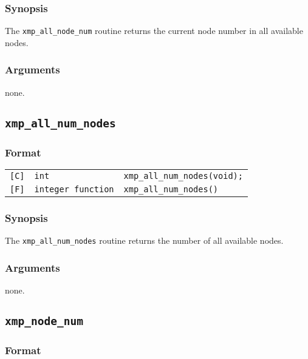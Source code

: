 \subsubsection*{Synopsis}
     The {\tt xmp\_all\_node\_num} routine returns the current node number in all available nodes.


\subsubsection*{Arguments}
    none.

\vspace{0.3cm}

\subsection{\tt xmp\_all\_num\_nodes}

\subsubsection*{Format}

\begin{tabular}{lll}

\verb![C]!&  {\tt int}& {\tt xmp\_all\_num\_nodes(void);}\\

\verb![F]!&  {\tt integer function}& {\tt xmp\_all\_num\_nodes()}

\end{tabular}

\subsubsection*{Synopsis}
     The {\tt xmp\_all\_num\_nodes} routine returns the number of all available nodes.

\subsubsection*{Arguments}
    none.


\vspace{0.3cm}

\subsection{\tt xmp\_node\_num}

\subsubsection*{Format}

